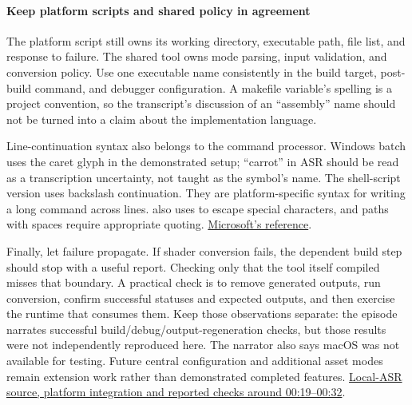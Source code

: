 \paragraph{Keep platform scripts and shared policy in agreement}\label{05-engine-i-ch013-keep-platform-scripts-and-shared-policy-in-agreement}

\hypertarget{05-engine-i-ch013-keep-platform-scripts-and-shared-policy-in-agreement}{}

The platform script still owns its working directory, executable path, file list, and response to failure. The shared tool owns mode parsing, input validation, and conversion policy. Use one executable name consistently in the build target, post-build command, and debugger configuration. A makefile variable's spelling is a project convention, so the transcript's discussion of an ``assembly'' name should not be turned into a claim about the implementation language.

Line-continuation syntax also belongs to the command processor. Windows batch uses the caret glyph \BookInlineCode{{\^{}}}{\^{}} in the demonstrated setup; ``carrot'' in ASR should be read as a transcription uncertainty, not taught as the symbol's name. The shell-script version uses backslash continuation. They are platform-specific syntax for writing a long command across lines.  also uses \BookInlineCode{{\^{}}}{\^{}} to escape special characters, and paths with spaces require appropriate quoting. \href{https://learn.microsoft.com/en-us/windows-server/administration/windows-commands/cmd}{Microsoft's  reference}.

Finally, let failure propagate. If shader conversion fails, the dependent build step should stop with a useful report. Checking only that the tool itself compiled misses that boundary. A practical check is to remove generated outputs, run conversion, confirm successful statuses and expected outputs, and then exercise the runtime that consumes them. Keep those observations separate: the episode narrates successful build/debug/output-regeneration checks, but those results were not independently reproduced here. The narrator also says macOS was not available for testing. Future central configuration and additional asset modes remain extension work rather than demonstrated completed features. \href{https://www.youtube.com/watch?v=cCEmwjfHIkY&t=1167}{Local-ASR source, platform integration and reported checks around 00:19--00:32}.

